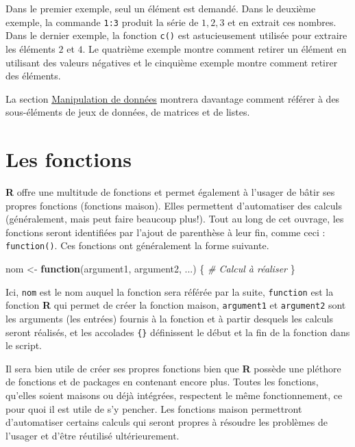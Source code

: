 \documentclass[
]{book}
\newenvironment{Shaded}{}{}
\newcommand{\CommentTok}[1]{\textit{#1}}
\newcommand{\ControlFlowTok}[1]{\textbf{#1}}
\newcommand{\NormalTok}[1]{#1}
\newcommand{\OtherTok}[1]{#1}
\begin{document}
Dans le premier exemple, seul un élément est demandé. Dans le deuxième exemple, la commande \texttt{1:3} produit la série de \(1,2,3\) et en extrait ces nombres. Dans le dernier exemple, la fonction \texttt{c()} est astucieusement utilisée pour extraire les éléments \(2\) et \(4\). Le quatrième exemple montre comment retirer un élément en utilisant des valeurs négatives et le cinquième exemple montre comment retirer des éléments.

La section \protect\hyperlink{manipulation-de-donnuxe9es}{Manipulation de données} montrera davantage comment référer à des sous-éléments de jeux de données, de matrices et de listes.

\hypertarget{les-fonctions}{%
\section{Les fonctions}\label{les-fonctions}}

\textbf{R} offre une multitude de fonctions et permet également à l'usager de bâtir ses propres fonctions (fonctions maison). Elles permettent d'automatiser des calculs (généralement, mais peut faire beaucoup plus!). Tout au long de cet ouvrage, les fonctions seront identifiées par l'ajout de parenthèse à leur fin, comme ceci : \texttt{function()}. Ces fonctions ont généralement la forme suivante.

\begin{Shaded}
\begin{Highlighting}[]
\NormalTok{nom }\OtherTok{\textless{}{-}} \ControlFlowTok{function}\NormalTok{(argument1, argument2, ...) \{}
  \CommentTok{\# Calcul à réaliser}
\NormalTok{\}}
\end{Highlighting}
\end{Shaded}

Ici, \texttt{nom} est le nom auquel la fonction sera référée par la suite, \texttt{function} est la fonction \textbf{R} qui permet de créer la fonction maison, \texttt{argument1} et \texttt{argument2} sont les arguments (les entrées) fournis à la fonction et à partir desquels les calculs seront réalisés, et les accolades \texttt{\{\}} définissent le début et la fin de la fonction dans le script.

Il sera bien utile de créer ses propres fonctions bien que \textbf{R} possède une pléthore de fonctions et de packages en contenant encore plus. Toutes les fonctions, qu'elles soient maisons ou déjà intégrées, respectent le même fonctionnement, ce pour quoi il est utile de s'y pencher. Les fonctions maison permettront d'automatiser certains calculs qui seront propres à résoudre les problèmes de l'usager et d'être réutilisé ultérieurement.
\end{document}

